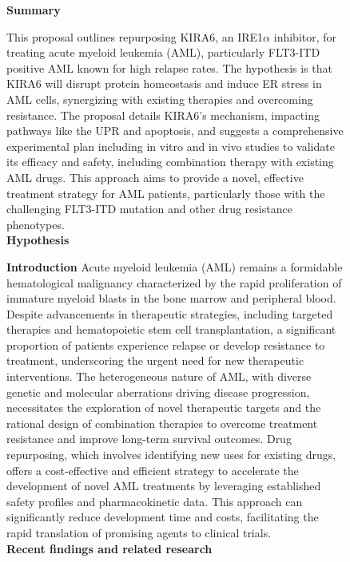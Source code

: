 \begin{figure}[htbp!]
\begin{tcolorbox}[
    colback=black!5!white,
    colframe=black!60!white,
    title=\textbf{KIRA6 for AML},
    fonttitle=\bfseries,
    arc=3mm,
    boxrule=1pt,
    bottomrule=2pt,
]
\scriptsize
\textbf{Summary}

This proposal outlines repurposing KIRA6, an IRE1$\alpha$ inhibitor, for treating acute myeloid leukemia (AML), particularly FLT3-ITD positive AML known for high relapse rates. The hypothesis is that KIRA6 will disrupt protein homeostasis and induce ER stress in AML cells, synergizing with existing therapies and overcoming resistance. The proposal details KIRA6's mechanism, impacting pathways like the UPR and apoptosis, and suggests a comprehensive experimental plan including in vitro and in vivo studies to validate its efficacy and safety, including combination therapy with existing AML drugs.  This approach aims to provide a novel, effective treatment strategy for AML patients, particularly those with the challenging FLT3-ITD mutation and other drug resistance phenotypes. \\


\textbf{Hypothesis}

\textbf{Introduction} Acute myeloid leukemia (AML) remains a formidable hematological malignancy characterized by the rapid proliferation of immature myeloid blasts in the bone marrow and peripheral blood. Despite advancements in therapeutic strategies, including targeted therapies and hematopoietic stem cell transplantation, a significant proportion of patients experience relapse or develop resistance to treatment, underscoring the urgent need for new therapeutic interventions. The heterogeneous nature of AML, with diverse genetic and molecular aberrations driving disease progression, necessitates the exploration of novel therapeutic targets and the rational design of combination therapies to overcome treatment resistance and improve long-term survival outcomes. Drug repurposing, which involves identifying new uses for existing drugs, offers a cost-effective and efficient strategy to accelerate the development of novel AML treatments by leveraging established safety profiles and pharmacokinetic data. This approach can significantly reduce development time and costs, facilitating the rapid translation of promising agents to clinical trials. \\

\textbf{Recent findings and related research}


\end{tcolorbox}
\end{figure}

